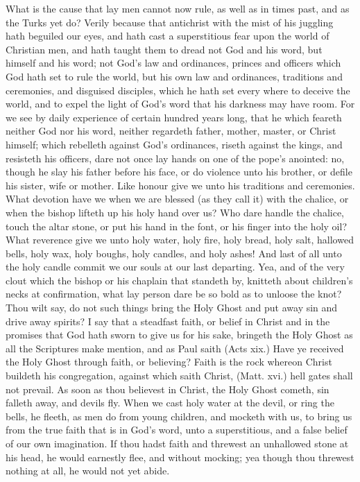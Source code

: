 What is the cause that lay men cannot now rule, as 
well as in times past, and as the Turks yet do? Verily 
because that antichrist with the mist of his juggling hath 
beguiled our eyes, and hath cast a superstitious fear upon 
the world of Christian men, and hath taught them to 
dread not God and his word, but himself and his word; 
not God's law and ordinances, princes and officers which 
God hath set to rule the world, but his own law and ordinances,
traditions and ceremonies, and disguised disciples, 
which he hath set every where to deceive the world, and 
to expel the light of God's word that his darkness may 
have room. For we see by daily experience of certain 
hundred years long, that he which feareth neither God nor 
his word, neither regardeth father, mother, master, or 
Christ himself; which rebelleth against God's ordinances, 
riseth against the kings, and resisteth his officers, dare not 
once lay hands on one of the pope's anointed: no, though 
he slay his father before his face, or do violence unto his 
brother, or defile his sister, wife or mother. Like honour 
give we unto his traditions and ceremonies. What devotion
have we when we are blessed (as they call it) with the 
chalice, or when the bishop lifteth up his holy hand over 
us? Who dare handle the chalice, touch the altar stone, 
or put his hand in the font, or his finger into the holy 
oil? What reverence give we unto holy water, holy fire, 
holy bread, holy salt, hallowed bells, holy wax, holy 
boughs, holy candles, and holy ashes! And last of all unto 
the holy candle commit we our souls at our last departing. 
Yea, and of the very clout which the bishop or his chaplain
that standeth by, knitteth about children's necks at 
confirmation, what lay person dare be so bold as to unloose
the knot? Thou wilt say, do not such things bring 
the Holy Ghost and put away sin and drive away spirits? 
I say that a steadfast faith, or belief in Christ and in the 
promises that God hath sworn to give us for his sake, 
bringeth the Holy Ghost as all the Scriptures make mention,
and as Paul saith (Acts xix.) Have ye received the 
Holy Ghost through faith, or believing? Faith is the 
rock whereon Christ buildeth his congregation, against 
which saith Christ, (Matt. xvi.) hell gates shall not prevail. 
As soon as thou believest in Christ, the Holy Ghost 
cometh, sin falleth away, and devils fly. When we cast 
holy water at the devil, or ring the bells, he fleeth, as men 
do from young children, and mocketh with us, to bring 
us from the true faith that is in God's word, unto a superstitious,
and a false belief of our own imagination. If 
thou hadst faith and threwest an unhallowed stone at 
his head, he would earnestly flee, and without mocking; 
yea though thou threwest nothing at all, he would not yet 
abide. 

